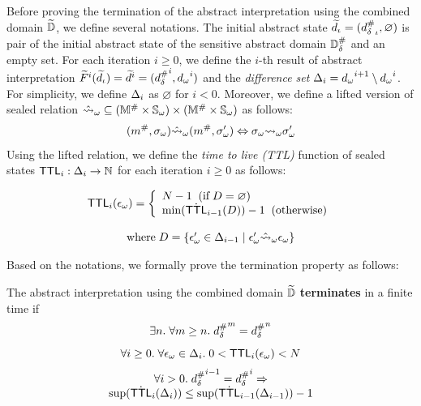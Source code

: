 Before proving the termination of the abstract interpretation using the combined
domain $\widetilde{\mathbb{D}}$, we define several notations. The initial abstract state
$\widetilde{d}_\iota = ({{d}^{\#}_\delta}_\iota, \varnothing)$ is pair of the initial abstract state of
the sensitive abstract domain ${\mathbb{D}}^{\#}_\delta$ and an empty set. For each iteration $i
\geq 0$, we define the $i$-th result of abstract interpretation
$\widetilde{F}^i(\widetilde{d}_\iota) = \widetilde{d}^i = ({{d}^{\#}_\delta}^i, {{d}_\omega}^i)$ and the
\textit{difference set} $\Delta_i = {{d}_\omega}^{i+1} \setminus {{d}_\omega}^i$.
For simplicity, we define $\Delta_i$ as $\varnothing$ for $i < 0$.  Moreover, we
define a lifted version of sealed relation $\hat{\leadsto}_\omega \subseteq
({\mathbb{M}}^{\#} \times {\mathbb{S}}_\omega) \times ({\mathbb{M}}^{\#} \times {\mathbb{S}}_\omega)$ as
follows:
\[
  ({m}^{\#}, {\sigma}_\omega) \hat{\leadsto}_\omega ({m}^{\#}, {\sigma}_\omega') \Leftrightarrow
  {\sigma}_\omega {\leadsto}_\omega {\sigma}_\omega'
\]
Using the lifted relation, we define the \textit{time to live (TTL)} function of
sealed states $\textsf{TTL}_i: \Delta_i \rightarrow \mathbb{N}$ for each iteration $i
\geq 0$ as follows:
\begin{definition}
  \[
    \begin{array}{c}
      \textsf{TTL}_i({\epsilon}_\omega) = \left \{
      \begin{array}{l}
        N - 1 \;\; ( \text{if} \; D = \varnothing)\\
        \text{min}(\dot{\textsf{TTL}}_{i-1}(D)) - 1
        \;\; ( \text{otherwise})
      \end{array}
      \right. \\
      \\
      \text{where} \; D =
      \{{\epsilon}_\omega' \in \Delta_{i-1} \mid {\epsilon}_\omega' \hat{\leadsto}_\omega {\epsilon}_\omega\}
    \end{array}
  \]
\end{definition}

Based on the notations, we formally prove the termination property as follows:
\begin{theorem}[Termination]\label{theorem:termination}
  The abstract interpretation using the combined domain $\widetilde{\mathbb{D}}$
  \textbf{terminates} in a finite time if
  \begin{equation}\label{equ:termination-sai}
    \exists n. \; \forall m \geq n. \; {{d}^{\#}_\delta}^m = {{d}^{\#}_\delta}^n
  \end{equation}
  \begin{equation}\label{equ:bounded-ttl}
    \forall i \geq 0. \; \forall {\epsilon}_\omega \in \Delta_i. \;
    0 < \textsf{TTL}_i({\epsilon}_\omega) < N
  \end{equation}
  \begin{equation}\label{equ:dec-ttl}
    \begin{array}{c}
      \forall i > 0. \; {{d}^{\#}_\delta}^{i-1} = {{d}^{\#}_\delta}^i \Rightarrow\\
      \sup(\dot {\textsf{TTL}}_i(\Delta_i)) \leq \sup(\dot {\textsf{TTL}}_{i-1}(\Delta_{i-1})) - 1
    \end{array}
  \end{equation}
\end{theorem}

